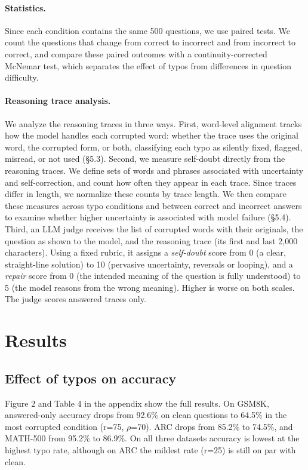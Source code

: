 \documentclass[11pt]{article}
\begin{document}
\paragraph{Statistics.} Since each condition contains the same 500 questions, we use paired tests. We count the questions that change from correct to incorrect and from incorrect to correct, and compare these paired outcomes with a continuity-corrected McNemar test, which separates the effect of typos from differences in question difficulty.

\paragraph{Reasoning trace analysis.} We analyze the reasoning traces in three ways. First, word-level alignment tracks how the model handles each corrupted word: whether the trace uses the original word, the corrupted form, or both, classifying each typo as silently fixed, flagged, misread, or not used (\S5.3). Second, we measure self-doubt directly from the reasoning traces. We define sets of words and phrases associated with uncertainty and self-correction, and count how often they appear in each trace. Since traces differ in length, we normalize these counts by trace length. We then compare these measures across typo conditions and between correct and incorrect answers to examine whether higher uncertainty is associated with model failure (\S5.4). Third, an LLM judge \citep{zheng2023} receives the list of corrupted words with their originals, the question as shown to the model, and the reasoning trace (its first and last 2,000 characters). Using a fixed rubric, it assigns a \emph{self-doubt} score from 0 (a clear, straight-line solution) to 10 (pervasive uncertainty, reversals or looping), and a \emph{repair} score from 0 (the intended meaning of the question is fully understood) to 5 (the model reasons from the wrong meaning). Higher is worse on both scales. The judge scores answered traces only.

\section{Results}
\subsection{Effect of typos on accuracy}
Figure 2 and Table 4 in the appendix show the full results. On GSM8K, answered-only accuracy drops from 92.6\% on clean questions to 64.5\% in the most corrupted condition (r=75, $\rho$=70). ARC drops from 85.2\% to 74.5\%, and MATH-500 from 95.2\% to 86.9\%. On all three datasets accuracy is lowest at the highest typo rate, although on ARC the mildest rate (r=25) is still on par with clean.
\end{document}
